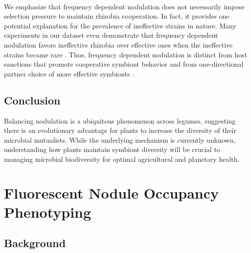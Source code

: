 \documentclass[12pt]{article}
\begin{document}
\begin{doublespace}
\paragraph{} %
We emphasize that frequency dependent nodulation does not necessarily impose selection pressure to maintain rhizobia cooperation. In fact, it provides one potential explanation for the prevalence of ineffective strains in nature. Many experiments in our dataset even demonstrate that frequency dependent nodulation favors ineffective rhizobia over effective ones when the ineffective strains became rare \cite{Amarger1982}\cite{Bloem2001}\cite{Robleto1998}. 
Thus, frequency dependent nodulation is distinct from host sanctions that promote cooperative symbiont behavior and from one-directional partner choice of more effective symbionts \cite{Kiers2003}. 

\subsection{Conclusion}
Balancing nodulation is a ubiquitous phenomenon across legumes, suggesting there is an evolutionary advantage for plants to increase the diversity of their microbial mutualists. While the underlying mechanism is currently unknown, understanding how plants maintain symbiont diversity will be crucial to managing microbial biodiversity for optimal agricultural and planetary health.



	\newpage
\section{Fluorescent Nodule Occupancy Phenotyping}
\subsection{Background}

\end{doublespace}
\end{document}
